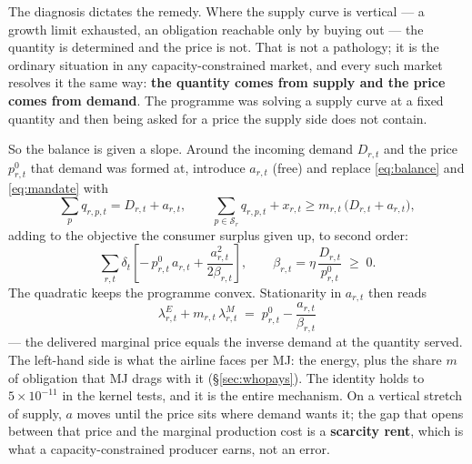 \documentclass[11pt,a4paper]{article}
\begin{document}
The diagnosis dictates the remedy. Where the supply curve is vertical --- a growth limit
exhausted, an obligation reachable only by buying out --- the quantity is determined and
the price is not. That is not a pathology; it is the ordinary situation in any
capacity-constrained market, and every such market resolves it the same way: \textbf{the
quantity comes from supply and the price comes from demand}. The programme was solving a
supply curve at a fixed quantity and then being asked for a price the supply side does
not contain.

So the balance is given a slope. Around the incoming demand $D_{r,t}$ and the price
$p^{0}_{r,t}$ that demand was formed at, introduce $a_{r,t}$ (free) and replace
\eqref{eq:balance} and \eqref{eq:mandate} with
\begin{equation}
\sum_{p} q_{r,p,t} = D_{r,t} + a_{r,t},
\qquad
\sum_{p \in \mathcal{S}_r} q_{r,p,t} + x_{r,t} \ge m_{r,t}\,\big(D_{r,t} + a_{r,t}\big),
\label{eq:elastic}
\end{equation}
adding to the objective the consumer surplus given up, to second order:
\begin{equation}
\sum_{r,t}\delta_t\left[-\,p^{0}_{r,t}\,a_{r,t} + \frac{a_{r,t}^{2}}{2\beta_{r,t}}\right],
\qquad \beta_{r,t} = \eta\,\frac{D_{r,t}}{p^{0}_{r,t}} \;\ge\; 0 .
\label{eq:surplus}
\end{equation}
The quadratic keeps the programme convex. Stationarity in $a_{r,t}$ then reads
\begin{equation}
\boxed{\;\lambda^{E}_{r,t} + m_{r,t}\,\lambda^{M}_{r,t} \;=\; p^{0}_{r,t} - \frac{a_{r,t}}{\beta_{r,t}}\;}
\label{eq:inversedemand}
\end{equation}
--- the delivered marginal price equals the inverse demand at the quantity served. The
left-hand side is what the airline faces per MJ: the energy, plus the share $m$ of
obligation that MJ drags with it (\S\ref{sec:whopays}). The identity holds to
$5\times10^{-11}$ in the kernel tests, and it is the entire mechanism. On a vertical
stretch of supply, $a$ moves until the price sits where demand wants it; the gap that
opens between that price and the marginal production cost is a \textbf{scarcity rent},
which is what a capacity-constrained producer earns, not an error.
\end{document}
